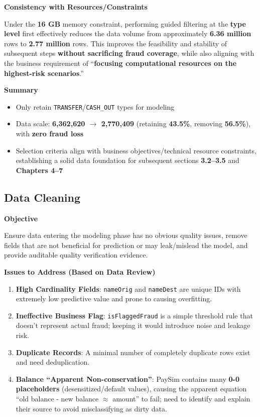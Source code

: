 \documentclass[sigplan,screen]{acmart}
\begin{document}
\textbf{Consistency with Resources/Constraints}

Under the \textbf{16 GB} memory constraint, performing guided filtering at the \textbf{type level} first effectively reduces the data volume from approximately \textbf{6.36 million} rows to \textbf{2.77 million} rows. This improves the feasibility and stability of subsequent steps \textbf{without sacrificing fraud coverage}, while also aligning with the business requirement of ``\textbf{focusing computational resources on the highest-risk scenarios}.''

\textbf{Summary}

\begin{itemize}
    \item Only retain \texttt{TRANSFER}/\texttt{CASH\_OUT} types for modeling
    \item Data scale: \textbf{6,362,620 $\rightarrow$ 2,770,409} (retaining \textbf{43.5\%}, removing \textbf{56.5\%}), with \textbf{zero fraud loss}
    \item Selection criteria align with business objectives/technical resource constraints, establishing a solid data foundation for subsequent sections \textbf{3.2--3.5} and \textbf{Chapters 4--7}
\end{itemize}

\subsection{Data Cleaning}

\textbf{Objective}

Ensure data entering the modeling phase has no obvious quality issues, remove fields that are not beneficial for prediction or may leak/mislead the model, and provide auditable quality verification evidence.

\textbf{Issues to Address (Based on Data Review)}

\begin{enumerate}
    \item \textbf{High Cardinality Fields}: \texttt{nameOrig} and \texttt{nameDest} are unique IDs with extremely low predictive value and prone to causing overfitting.
    \item \textbf{Ineffective Business Flag}: \texttt{isFlaggedFraud} is a simple threshold rule that doesn't represent actual fraud; keeping it would introduce noise and leakage risk.
    \item \textbf{Duplicate Records}: A minimal number of completely duplicate rows exist and need deduplication.
    \item \textbf{Balance ``Apparent Non-conservation''}: PaySim contains many \textbf{0-0 placeholders} (desensitized/default values), causing the apparent equation ``old balance - new balance $\approx$ amount'' to fail; need to identify and explain their source to avoid misclassifying as dirty data.
\end{enumerate}
\end{document}
